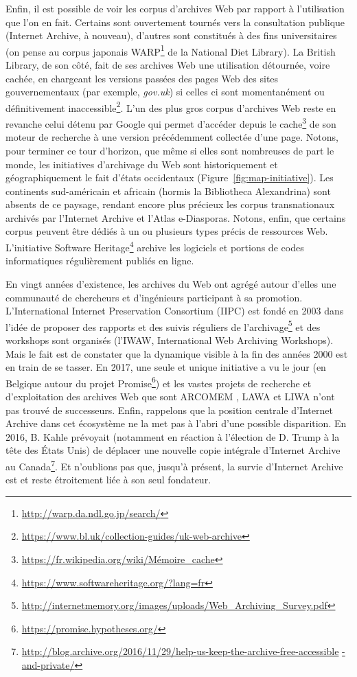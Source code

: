 \documentclass[symmetric,justified,marginals=raggedouter]{tufte-book}
\begin{document}
\noindent Enfin, il est possible de voir les corpus d'archives Web par rapport à l'utilisation que l'on en fait. Certains sont ouvertement tournés vers la consultation publique (Internet Archive, à nouveau), d'autres sont constitués à des fins universitaires (on pense au corpus japonais WARP\footnote{\RaggedOuter \url{http://warp.da.ndl.go.jp/search/}} de la National Diet Library). La British Library, de son côté, fait de ses archives Web une utilisation détournée, voire cachée, en chargeant les versions passées des pages Web des sites gouvernementaux (par exemple, \textit{gov.uk}) si celles ci sont momentanément ou définitivement inaccessible\footnote{\RaggedOuter \url{https://www.bl.uk/collection-guides/uk-web-archive}}. L'un des plus gros corpus d'archives Web reste en revanche celui détenu par Google qui permet d'accéder depuis le cache\footnote{\RaggedOuter \url{https://fr.wikipedia.org/wiki/Mémoire_cache}} de son moteur de recherche à une version précédemment collectée d'une page. Notons, pour terminer ce tour d'horizon, que même si elles sont nombreuses de part le monde, les initiatives d'archivage du Web sont historiquement et géographiquement le fait d'états occidentaux (Figure~\ref{fig:map-initiative}). Les continents sud-américain et africain (hormis la Bibliotheca Alexandrina) sont absents de ce paysage, rendant encore plus précieux les corpus transnationaux archivés par l'Internet Archive et l'Atlas e-Diasporas. Notons, enfin, que certains corpus peuvent être dédiés à un ou plusieurs types précis de ressources Web. L'initiative Software Heritage\footnote{\RaggedOuter \url{https://www.softwareheritage.org/?lang=fr}} archive les logiciels et portions de codes informatiques régulièrement publiés en ligne. 

En vingt années d'existence, les archives du Web ont agrégé autour d'elles une communauté de chercheurs et d'ingénieurs participant à sa promotion. L'International Internet Preservation Consortium (IIPC) est fondé en 2003 dans l'idée de proposer des rapports et des suivis réguliers de l'archivage\footnote{\RaggedOuter \url{http://internetmemory.org/images/uploads/Web\_Archiving\_Survey.pdf}} et des workshops sont organisés (l'IWAW, International Web Archiving Workshops). Mais le fait est de constater que la dynamique visible à la fin des années 2000 est en train de se tasser. En 2017, une seule et unique initiative a vu le jour (en Belgique autour du projet Promise\footnote{\RaggedOuter \url{https://promise.hypotheses.org/}}) et les vastes projets de recherche et d'exploitation des archives Web que sont ARCOMEM \citep{risse_arcomem_2014}, LAWA \citep{spaniol_tracking_2012} et LIWA \citep{denev_sharc:_2009} n'ont pas trouvé de successeurs. Enfin, rappelons que la position centrale d'Internet Archive dans cet écosystème ne la met pas à l'abri d'une possible disparition. En 2016, B. Kahle prévoyait (notamment en réaction à l'élection de D. Trump à la tête des États Unis) de déplacer une nouvelle copie intégrale d'Internet Archive au Canada\footnote{\RaggedOuter \url{http://blog.archive.org/2016/11/29/help-us-keep-the-archive-free-accessible} \url{-and-private/}}. Et n'oublions pas que, jusqu'à présent, la survie d'Internet Archive est et reste étroitement liée à son seul fondateur.  
\end{document}
